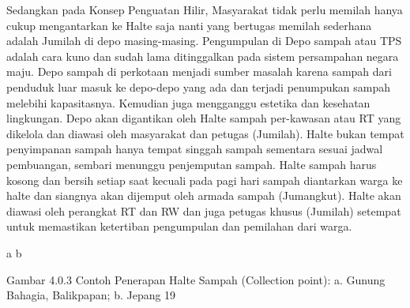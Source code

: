 \documentclass[
  letterpaper,
  DIV=11,
  numbers=noendperiod]{scrreprt}
\begin{document}
Sedangkan pada Konsep Penguatan Hilir, Masyarakat tidak perlu memilah
hanya cukup mengantarkan ke Halte saja nanti yang bertugas memilah
sederhana adalah Jumilah di depo masing-masing. Pengumpulan di Depo
sampah atau TPS adalah cara kuno dan sudah lama ditinggalkan pada sistem
persampahan negara maju. Depo sampah di perkotaan menjadi sumber masalah
karena sampah dari penduduk luar masuk ke depo-depo yang ada dan terjadi
penumpukan sampah melebihi kapasitasnya. Kemudian juga mengganggu
estetika dan kesehatan lingkungan. Depo akan digantikan oleh Halte
sampah per-kawasan atau RT yang dikelola dan diawasi oleh masyarakat dan
petugas (Jumilah). Halte bukan tempat penyimpanan sampah hanya tempat
singgah sampah sementara sesuai jadwal pembuangan, sembari menunggu
penjemputan sampah. Halte sampah harus kosong dan bersih setiap saat
kecuali pada pagi hari sampah diantarkan warga ke halte dan siangnya
akan dijemput oleh armada sampah (Jumangkut). Halte akan diawasi oleh
perangkat RT dan RW dan juga petugas khusus (Jumilah) setempat untuk
memastikan ketertiban pengumpulan dan pemilahan dari warga.

a b

Gambar 4.0.3 Contoh Penerapan Halte Sampah (Collection point): a. Gunung
Bahagia, Balikpapan; b. Jepang 19
\end{document}
